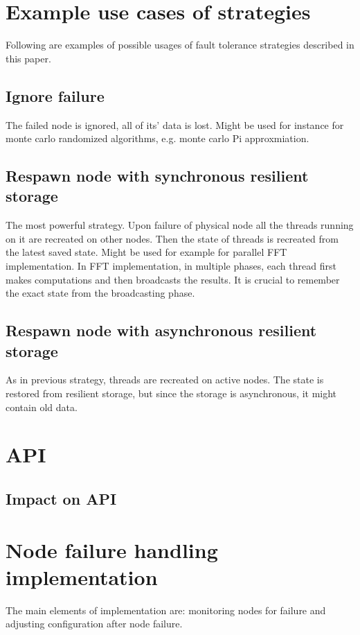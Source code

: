 \documentclass[12pt]{article}
\begin{document}
\section{Example use cases of strategies}
Following are examples of possible usages of fault tolerance strategies described in this paper.
\subsection{Ignore failure}
The failed node is ignored, all of its' data is lost.
Might be used for instance for monte carlo randomized algorithms, e.g. monte carlo Pi approxmiation.
\subsection{Respawn node with synchronous resilient storage}
The most powerful strategy. Upon failure of physical node all the threads running on it are recreated on other nodes.
Then the state of threads is recreated from the latest saved state.
Might be used for example for parallel FFT implementation.
In FFT implementation, in multiple phases, each thread first makes computations and then broadcasts the results.
It is crucial to remember the exact state from the broadcasting phase.
\subsection{Respawn node with asynchronous resilient storage}
As in previous strategy, threads are recreated on active nodes.
The state is restored from resilient storage, but since the storage is asynchronous, it might contain old data.

\section{API}

\subsection{Impact on API}

\section{Node failure handling implementation}

The main elements of implementation are: monitoring nodes for failure and adjusting configuration after node failure.
\end{document}
